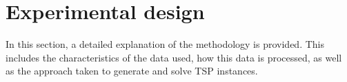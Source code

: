 \section{Experimental design}
In this section, a detailed explanation of the methodology is provided. This includes the
characteristics of the data used, how this data is processed, as well as the approach taken to
generate and solve TSP instances.








